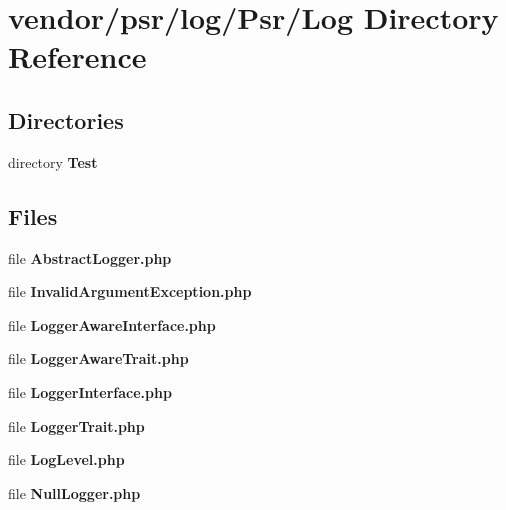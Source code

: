 \section{vendor/psr/log/\+Psr/\+Log Directory Reference}
\label{dir_8f243db93ca67ad146b7b94d2f4206a0}
\subsection*{Directories}
\begin{DoxyCompactItemize}
\item 
directory {\bf Test}
\end{DoxyCompactItemize}
\subsection*{Files}
\begin{DoxyCompactItemize}
\item 
file {\bf Abstract\+Logger.\+php}
\item 
file {\bf Invalid\+Argument\+Exception.\+php}
\item 
file {\bf Logger\+Aware\+Interface.\+php}
\item 
file {\bf Logger\+Aware\+Trait.\+php}
\item 
file {\bf Logger\+Interface.\+php}
\item 
file {\bf Logger\+Trait.\+php}
\item 
file {\bf Log\+Level.\+php}
\item 
file {\bf Null\+Logger.\+php}
\end{DoxyCompactItemize}
